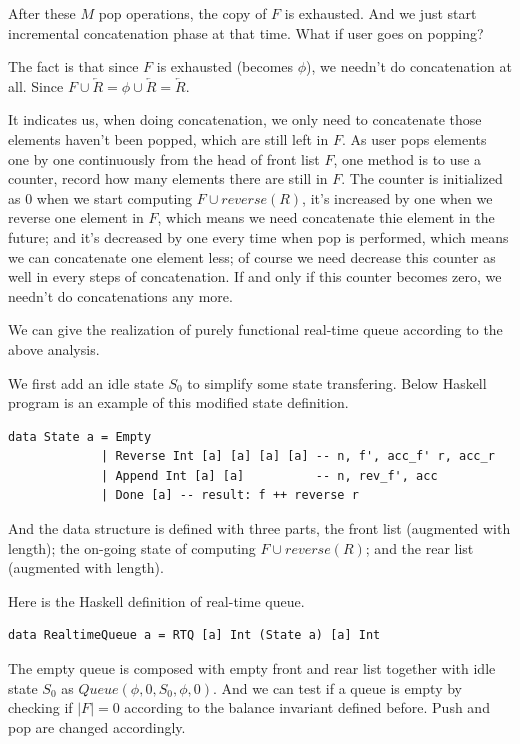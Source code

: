 \documentclass{article}
\begin{document}
After these $M$ pop operations, the copy of $F$ is exhausted. And we just
start incremental concatenation phase at that time. What if user goes
on popping?

The fact is that since $F$ is exhausted (becomes $\phi$), we needn't do concatenation
at all. Since $F \cup \overleftarrow{R} = \phi \cup \overleftarrow{R} = \overleftarrow{R}$.

It indicates us, when doing concatenation, we only need to concatenate those elements
haven't been popped, which are still left in $F$. As user pops elements one by one
continuously from the head of front list $F$, one method is to use a counter,
record how many elements there are still in $F$. The counter is initialized as 0
when we start computing $F \cup reverse(R)$, it's increased by one when we reverse
one element in $F$, which means we need concatenate thie element in the future;
and it's decreased by one every time when pop is
performed, which means we can concatenate one element less; of course we need decrease
this counter as well in every steps of concatenation. If and only if this counter
becomes zero, we needn't do concatenations any more.

We can give the realization of purely functional real-time queue according to the above
analysis.

We first add an idle state $S_0$ to simplify some state transfering. Below Haskell program
is an example of this modified state definition.

\lstset{language=Haskell}
\begin{lstlisting}
data State a = Empty
             | Reverse Int [a] [a] [a] [a] -- n, f', acc_f' r, acc_r
             | Append Int [a] [a]          -- n, rev_f', acc
             | Done [a] -- result: f ++ reverse r
\end{lstlisting}

And the data structure is defined with three parts, the front list (augmented with length);
the on-going state of computing $F \cup reverse(R)$; and the rear list (augmented with length).

Here is the Haskell definition of real-time queue.

\lstset{language=Haskell}
\begin{lstlisting}
data RealtimeQueue a = RTQ [a] Int (State a) [a] Int
\end{lstlisting}

The empty queue is composed with empty front and rear list together with idle state $S_0$ as
$Queue(\phi, 0, S_0, \phi, 0)$. And we can test if a queue is empty by checking if $|F| = 0$
according
to the balance invariant defined before. Push and pop are changed accordingly.
\end{document}
